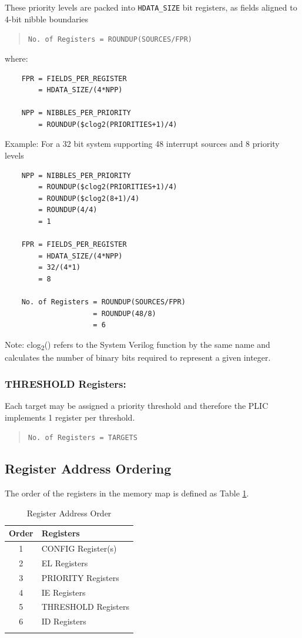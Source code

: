 These priority levels are packed into
\texttt{HDATA\_SIZE} bit registers, as fields aligned to
4-bit nibble boundaries

\begin{quote}
\texttt{No.\ of\ Registers\ =\ ROUNDUP(SOURCES/FPR)}
\end{quote}
where:
\indent
\begin{verbatim}
    FPR = FIELDS_PER_REGISTER    
        = HDATA_SIZE/(4*NPP)

    NPP = NIBBLES_PER_PRIORITY
        = ROUNDUP($clog2(PRIORITIES+1)/4)
\end{verbatim}

Example: For a 32 bit system supporting 48 interrupt sources and 8
priority levels

\begin{verbatim}
    NPP = NIBBLES_PER_PRIORITY
        = ROUNDUP($clog2(PRIORITIES+1)/4)
        = ROUNDUP($clog2(8+1)/4)
        = ROUNDUP(4/4)
        = 1

    FPR = FIELDS_PER_REGISTER
        = HDATA_SIZE/(4*NPP)
        = 32/(4*1)
        = 8

    No. of Registers = ROUNDUP(SOURCES/FPR)
                     = ROUNDUP(48/8)
                     = 6
\end{verbatim}

Note: clog\textsubscript{2}() refers to the System Verilog function by
the same name and calculates the number of binary bits required to
represent a given integer.

\subsubsection{THRESHOLD Registers:}

Each target may be assigned a priority threshold and therefore the PLIC
implements 1 register per threshold.

\begin{quote}
\texttt{No.\ of\ Registers\ =\ TARGETS}
\end{quote}

\subsection{Register Address Ordering}

The order of the registers in the memory map is defined as Table \ref{tab:REGMAP}.

\begin{longtable}[]{@{}cl@{}}	
		\toprule 
		\textbf{Order} & \textbf{Registers}\\
		\midrule
		\endhead 
		1 & CONFIG Register(s)\\
		2 & EL Registers\\
		3 & PRIORITY Registers\\
		4 & IE Registers\\
		5 & THRESHOLD Registers\\
		6 & ID Registers\\
		\bottomrule 	
	\caption{Register Address Order}
	\label{tab:REGMAP}
\end{longtable}

